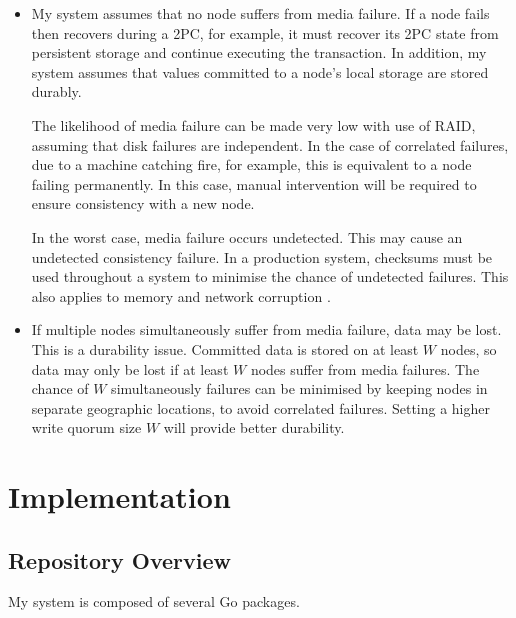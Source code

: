 \documentclass[12pt,a4paper,twoside,openany]{report}
\begin{document}
\begin{itemize}
\item
My system assumes that no node suffers from media failure. If a node fails then recovers during a 2PC, for example, it must recover its 2PC state from persistent storage and continue executing the transaction. In addition, my system assumes that values committed to a node's local storage are stored durably.

The likelihood of media failure can be made very low with use of RAID, assuming that disk failures are independent.
In the case of correlated failures, due to a machine catching fire, for example, this is equivalent to a node failing permanently. In this case, manual intervention will be required to ensure consistency with a new node.

In the worst case, media failure occurs undetected. This may cause an undetected consistency failure. In a production system, checksums must be used throughout a system to minimise the chance of undetected failures. This also applies to memory and network corruption \cite{chang2008bigtable}.

\item
If multiple nodes simultaneously suffer from media failure, data may be lost. This is a durability issue. Committed data is stored on at least $W$ nodes, so data may only be lost if at least $W$ nodes suffer from media failures. The chance of $W$ simultaneously failures can be minimised by keeping nodes in separate geographic locations, to avoid correlated failures. Setting a higher write quorum size $W$ will provide better durability.

\end{itemize}

\chapter{Implementation}

\section{Repository Overview}

My system is composed of several Go packages.
\end{document}
